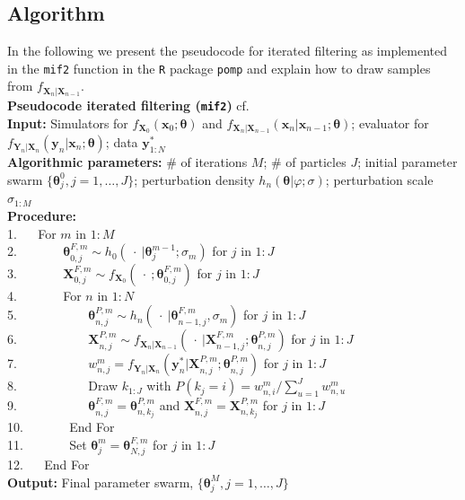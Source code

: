 \subsection{Algorithm}
\label{mif_algorithm}
In the following we present the pseudocode for iterated filtering as implemented in the \texttt{mif2} function in the \texttt{R} package \texttt{pomp} and explain how to draw samples from $f_{\bm{X}_n|\bm{X}_{n-1}}$. 
\\
\newline
\textbf{Pseudocode iterated filtering (\texttt{mif2}) }cf.\ \cite{Ionides2015}\\
{\footnotesize{\textbf{Input:}  
 Simulators for $f_{\bm{X}_0}(\bm{x}_0;\boldsymbol{\theta})$ and $f_{\bm{X}_n|\bm{X}_{n-1}}(\bm{x}_n| \bm{x}_{n-1}; \boldsymbol{\theta})$;  
 evaluator for $f_{\bm{Y}_n|\bm{X}_n}(\bm{y}_n|\bm{x}_n;\boldsymbol{\theta})$;  
data $\bm{y}^*_{1:N}$ \\
\textbf{Algorithmic parameters:}
\# of iterations $M$;  
\#  of particles $J$;  
initial parameter swarm $\{\boldsymbol{\theta}^0_j, j=1,\dots,J\}$;  
perturbation density $h_n(\boldsymbol{\theta}|\varphi;\sigma)$;  
perturbation scale $\sigma_{1{:}M}$ \\
\vspace{0.1cm}
\textbf{Procedure:}\\
1. $\quad$ For $m$ in $1{:} M$\\
 2. $\quad\quad\quad$ $\boldsymbol{\theta}^{F,m}_{0,j}\sim h_0(\ \cdot \ |\bm{\theta}^{m-1}_{j}; \sigma_m)$ for $j$ in $1{:} J$\\
 3. $\quad\quad\quad$ $\bm{X}_{0,j}^{F,m}\sim f_{\bm{X}_0}(\ \cdot \ ; \bm{\theta}^{F,m}_{0,j})$ for $j$ in $1{:} J$\\
 4. $\quad\quad\quad$ For $n$ in $1{:} N$\\
 5. $\quad\quad\quad\quad\quad$ $\bm{\theta}^{P,m}_{n,j}\sim h_n(\ \cdot \ |\bm{\theta}^{F,m}_{n-1,j},\sigma_m)$ for $j$ in $1{:} J$\\
 6. $\quad\quad\quad\quad\quad$ $\bm{X}_{n,j}^{P,m}\sim f_{\bm{X}_n|\bm{X}_{n-1}}(\ \cdot \  |\bm{X}^{F,m}_{n-1,j}; \bm{\theta}^{P,m}_{n,j})$ for $j$ in $1{:} J$\\
 7. $\quad\quad\quad\quad\quad$ $w_{n,j}^m = f_{\bm{Y}_n|\bm{X}_n}(\bm{y}^*_n| \bm{X}_{n,j}^{P,m} ; \bm{\theta}^{P,m}_{n,j})$ for $j$ in $1{:} J$\\
 8. $\quad\quad\quad\quad\quad$ Draw $k_{1{:}J}$ with $P(k_j=i)=  w_{n,i}^m\Big/\sum_{u=1}^J w_{n,u}^m$\\
 9.  $\quad\quad\quad\quad\quad$ $\bm{\theta}^{F,m}_{n,j}=\bm{\theta}^{P,m}_{n,k_j}$ and $\bm{X}^{F,m}_{n,j}=\bm{X}^{P,m}_{n,k_j}$ for $j$ in $1{:} J$\\
 10. $\quad\quad\quad$ End For\\
 11. $\quad\quad\quad$ Set $\bm{\theta}^{m}_{j}=\bm{\theta}^{F,m}_{N,j}$ for $j$ in $1{:} J$\\
 12. $\quad$ End For\\
 \vspace{0.5cm}
\textbf{Output:}  
Final parameter swarm, $\{\bm{\theta}^M_j, j=1,\dots,J\}$ }}\\
